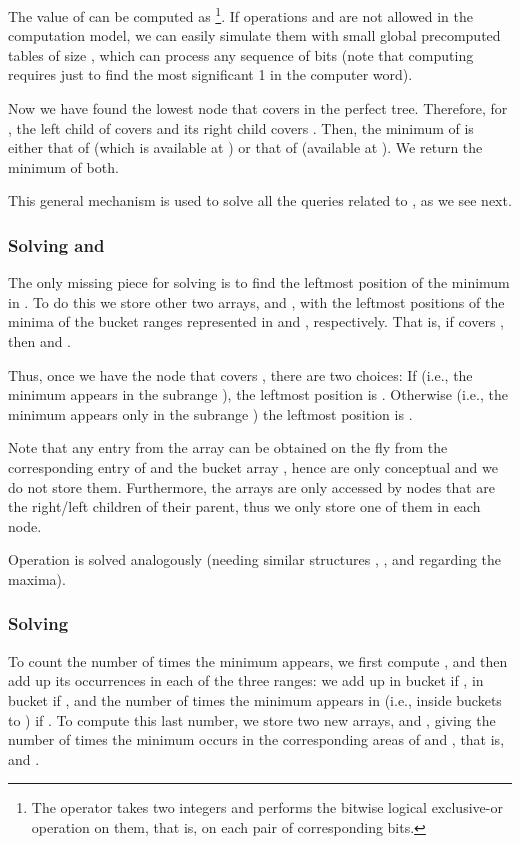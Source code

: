 \documentclass[11pt]{article}
\newcommand{\0}{\mathit{0}}
\newcommand{\1}{\mathit{1}}
\begin{document}
The value of  can be computed as \footnote{The  operator
        takes two integers and performs the bitwise logical exclusive-or 
operation on them, that is, on each pair of corresponding bits.}. 
If operations  and  are not allowed in the computation model, we can
easily simulate them with small global precomputed tables of size 
, 
which can process any sequence of  bits (note that computing 
requires just to find the most significant 1 in the computer word).

Now we have found the lowest node  that covers  in
the perfect tree. Therefore, for , the left child  of 
covers  and its right child  covers . Then, the minimum
of  is either that of  (which is available at ) or
that of  (available at ). We return the minimum of
both. 

This general mechanism is used to solve all the queries related to ,
as we see next.

\subsubsection{Solving  and } \label{sec:rmq}

The only missing piece for solving  is to find the leftmost 
position of the minimum in . To do this we store other two arrays,
 and , with the leftmost positions of the minima of the bucket ranges
represented in  and , respectively. That is, if  covers , then
 and
.

Thus, once we have the node  that covers , there are two
choices: If  (i.e., the minimum appears 
in the subrange ), the leftmost position is . Otherwise 
(i.e., the minimum appears only in the subrange ) the leftmost
position is . 

Note that any entry from the array  can be
obtained on the fly from the corresponding entry of  and the bucket
array , hence  are only conceptual and we do not store them.
Furthermore, the arrays  are only accessed by nodes that are the
right/left children of their parent, thus we only store one of them in each
node. 

Operation  is solved analogously (needing similar structures , 
,  and  regarding the maxima).

\subsubsection{Solving } \label{sec:mincount}

To count the number of times the minimum appears, we first compute 
, and then add up its occurrences in each of the
three ranges: we add up  in bucket  if
,  in bucket  if ,
and the number of times the minimum appears in  
(i.e., inside buckets  to ) if . To compute this last number,
we store two new arrays,  and , giving the number of times the minimum
occurs in the corresponding areas of  and , that is,
 and
. 
\end{document}
